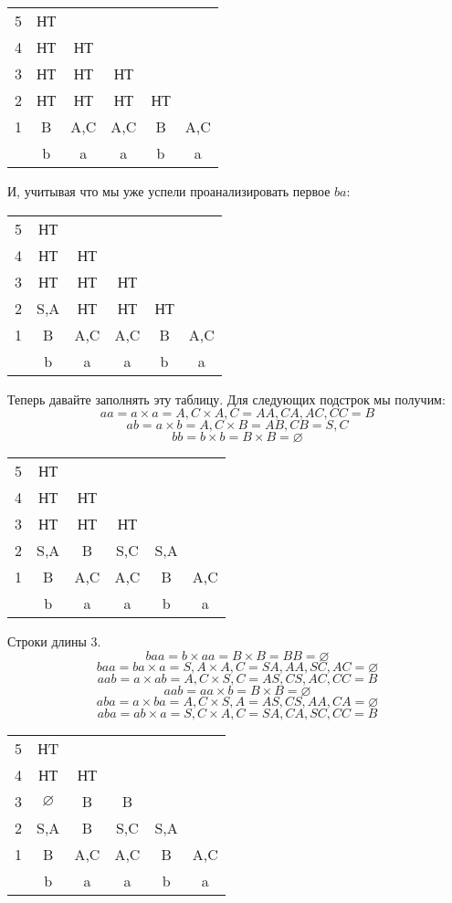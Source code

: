 \documentclass{article}
\begin{document}
\begin{center}
    \begin{tabular}{ c c c c c c }
    5 & НТ  \\ 
    4 & НТ & НТ   \\  
    3 & НТ & НТ & НТ   \\  
    2 & НТ & НТ & НТ & НТ  \\  
    1 & B & A,C & A,C & B & A,C  \\
      & b  &  a &  a & b  &  a 
    \end{tabular}
\end{center}
И, учитывая что мы уже успели проанализировать первое $ba$:
\begin{center}
    \begin{tabular}{ c c c c c c }
    5 & НТ  \\ 
    4 & НТ & НТ   \\  
    3 & НТ & НТ & НТ   \\  
    2 & S,A & НТ & НТ & НТ  \\  
    1 & B & A,C & A,C & B & A,C  \\
      & b  &  a &  a & b  &  a 
    \end{tabular}
\end{center}
Теперь давайте заполнять эту таблицу. Для следующих подстрок мы получим:
$$aa = a\times a = A,C \times A,C = AA, CA, AC, CC = B$$
$$ab = a\times b = A,C \times B = AB, CB = S, C$$
$$bb = b\times b = B \times B = \varnothing$$
\begin{center}
    \begin{tabular}{ c c c c c c }
    5 & НТ \\ 
    4 & НТ & НТ   \\  
    3 & НТ & НТ & НТ   \\  
    2 & S,A & B & S,C & S,A  \\  
    1 & B & A,C & A,C & B & A,C  \\
      & b  &  a &  a & b  &  a 
    \end{tabular}
\end{center}
Строки длины 3.
$$baa = b\times aa = B \times B = BB = \varnothing$$
$$baa = ba\times a = S,A \times A,C = SA, AA, SC, AC = \varnothing$$
$$aab = a\times ab = A,C \times S,C = AS, CS, AC, CC = B$$
$$aab = aa\times b = B \times B = \varnothing$$
$$aba = a\times ba = A,C \times S,A = AS, CS, AA, CA = \varnothing$$
$$aba = ab\times a = S,C \times A,C = SA, CA, SC, CC = B$$
\begin{center}
    \begin{tabular}{ c c c c c c }
    5 & НT \\ 
    4 & НТ & НТ   \\  
    3 & $\varnothing$ & B & B   \\  
    2 & S,A & B & S,C & S,A  \\  
    1 & B & A,C & A,C & B & A,C  \\
      & b  &  a &  a & b  &  a 
    \end{tabular}
\end{center}
\end{document}
